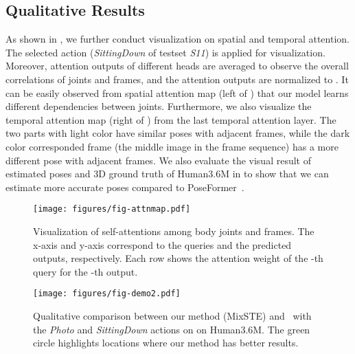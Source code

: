 \documentclass[10pt,twocolumn,letterpaper]{article}
\begin{document}
\subsection{Qualitative Results}
As shown in , we further conduct visualization on spatial and temporal attention. 
	The selected action (\textit{SittingDown} of testset \textit{S11}) is applied for visualization. 
	Moreover, attention outputs of different heads are averaged to observe the overall correlations of joints and frames, and the attention outputs are normalized to . 
It can be easily observed from spatial attention map (left of ) that our model learns different dependencies between joints.
	Furthermore, we also visualize the temporal attention map (right of ) from the last temporal attention layer. 
The two parts with light color have similar poses with adjacent frames, while the dark color corresponded frame (the middle image in the frame sequence) has a more different pose with adjacent frames.
	We also evaluate the visual result of estimated poses and 3D ground truth of Human3.6M in  to show that we can estimate more accurate poses compared to PoseFormer~\cite{poseformer}.
\begin{figure}[htp]
		\centering
\texttt{[image: figures/fig-attnmap.pdf]}
		\vspace{-0.9cm}
		\caption{
			Visualization of self-attentions among body joints and frames. 
			The x-axis and y-axis correspond to the queries and the predicted outputs, respectively. 
			Each row shows the attention weight  of the -th query for the -th output.
		}
		\label{fig:attnmap}
		\vspace{-0.3cm}
	\end{figure}
	\begin{figure}[htp]
		\centering
\texttt{[image: figures/fig-demo2.pdf]}
		\caption{Qualitative comparison between our method (MixSTE) and~\cite{poseformer} with the \textit{Photo} and \textit{SittingDown} actions on on Human3.6M. The green circle highlights locations where our method has better results.}
		\label{fig:demo}
		\vspace{-0.3cm}
	\end{figure}
	
\end{document}

